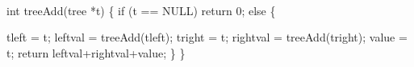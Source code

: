 {\tt
\begin{program}{0}
{} int treeAdd(tree *t) \{
 if (t == NULL)
  return 0;
  else \{

    tleft = t;
    leftval = treeAdd(tleft);
    tright = t;
    rightval = treeAdd(tright);
    value = t;
    return leftval+rightval+value;
  \}
	\}
   \end{program}
  }